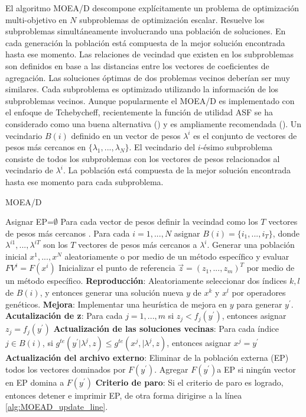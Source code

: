 El algoritmo MOEA/D descompone explícitamente un problema de optimización multi-objetivo en $N$ subproblemas de optimización escalar.
%
Resuelve los subproblemas simultáneamente involucrando una población de soluciones.
%
En cada generación la población está compuesta de la mejor solución encontrada hasta ese momento.
%
Las relaciones de vecindad que existen en los subproblemas son definidos en base a las distancias entre los vectores de coeficientes de agregación.
%
Las soluciones óptimas de dos problemas vecinos deberían ser muy similares.
%
Cada subproblema es optimizado utilizando la información de los subproblemas vecinos.
%
Aunque popularmente el MOEA/D es implementado con el enfoque de Tchebycheff, recientemente la función de utilidad ASF se ha considerado como una buena alternativa (\cite{Joel:ASF}) y es ampliamente recomendada (\cite{Joel:MOMBI-II}). 
%
Un vecindario $B(i)$ definido en un vector de pesos $\lambda^i$ es el conjunto de vectores de pesos más cercanos en $\{ \lambda_1, ..., \lambda_N \}$.
%
El vecindario del $i$-ésimo subproblema consiste de todos los subproblemas con los vectores de pesos relacionados al vecindario de $\lambda^i$.
%
La población está compuesta de la mejor solución encontrada hasta ese momento para cada subproblema.
%


\begin{algorithm}[H]
\scriptsize
\caption{MOEA/D}
\label{alg:MOEAD}
\begin{scriptsize}
\begin{algorithmic}[1]
	\STATE Asignar EP=$\emptyset$
    \STATE Para cada vector de pesos definir la vecindad como los $T$ vectores de pesos más cercanos . Para cada $i=1,...,N$ asignar $B(i)= \{ i_1, ..., i_T  \}$, donde $\lambda^{i1}, ..., \lambda^{iT}$ son los $T$  vectores de pesos más cercanos a $\lambda^i$.
    \STATE Generar una población inicial $x^1,...,x^N$ aleatoriamente o por medio de un método específico y evaluar $FV^i=F(x^i)$
    \STATE Inicializar el punto de referencia $\vec{z}=(z_1, ..., z_m)^T$ por medio de un método específico.
     \label{alg:MOEAD_update_line}
       \STATE \textbf{Reproducción}: Aleatoriamente seleccionar dos índices $k, l$ de $B(i)$, y entonces generar una solución nueva $y$ de $x^k$ y $x^l$ por operadores genéticos.
       \STATE \textbf{Mejora}: Implementar una heurística de mejora en  $y$ para generar $y^\prime$.
       \STATE \textbf{Acutalización de z}: Para cada $j =1,...,m$ si $z_j < f_j(y^\prime)$, entonces asignar $z_j = f_j(y^\prime)$
       \STATE \textbf{Actualización de las soluciones vecinas}: Para cada índice $j \in B(i)$, si $g^{te}(y^\prime | \lambda^j, z) \leq g^{te}(x^j, | \lambda^j, z)$, entonces asignar $x^j = y^\prime$
       \STATE \textbf{Actualización del archivo externo}: Eliminar de la población externa (EP) todos los vectores dominados por $F(y^\prime)$. Agregar $F(y^\prime)$a EP si ningún vector en EP domina a $F(y^\prime)$
    \ENDFOR
    \STATE \textbf{Criterio de paro}: Si el criterio de paro es logrado, entonces detener e imprimir EP, de otra forma dirigirse a la línea \ref{alg:MOEAD_update_line}.
\end{algorithmic}
\end{scriptsize}
\end{algorithm}


